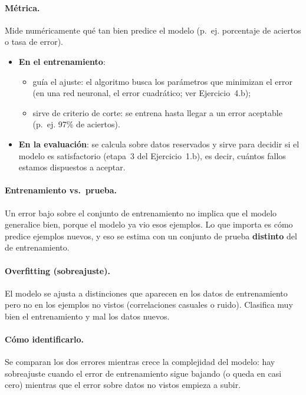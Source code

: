 \documentclass[11pt,a4paper]{article}
\begin{document}
\paragraph{Métrica.} Mide numéricamente qué tan bien predice el modelo (p.~ej. porcentaje de aciertos o tasa de error).
\begin{itemize}
  \item \textbf{En el entrenamiento}:
  \begin{itemize}
    \item guía el ajuste: el algoritmo busca los parámetros que minimizan el error (en una red neuronal, el error cuadrático; ver Ejercicio~4.b);
    \item sirve de criterio de corte: se entrena hasta llegar a un error aceptable (p.~ej. 97\% de aciertos).
  \end{itemize}
  \item \textbf{En la evaluación}: se calcula sobre datos reservados y sirve para decidir si el modelo es satisfactorio (etapa~3 del Ejercicio~1.b), es decir, cuántos fallos estamos dispuestos a aceptar.
\end{itemize}

\paragraph{Entrenamiento vs.\ prueba.} Un error bajo sobre el conjunto de entrenamiento no implica que el modelo generalice bien, porque el modelo ya vio esos ejemplos. Lo que importa es cómo predice ejemplos nuevos, y eso se estima con un conjunto de prueba \textbf{distinto} del de entrenamiento.

\paragraph{Overfitting (sobreajuste).} El modelo se ajusta a distinciones que aparecen en los datos de entrenamiento pero no en los ejemplos no vistos (correlaciones casuales o ruido). Clasifica muy bien el entrenamiento y mal los datos nuevos.

\paragraph{Cómo identificarlo.} Se comparan los dos errores mientras crece la complejidad del modelo: hay sobreajuste cuando el error de entrenamiento sigue bajando (o queda en casi cero) mientras que el error sobre datos no vistos empieza a subir.
\end{document}
